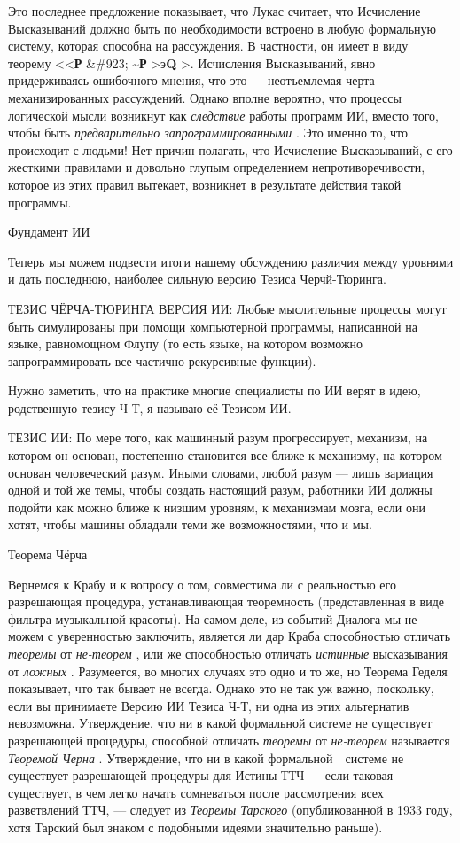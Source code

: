 \documentclass[../main.tex]{subfiles}
\begin{document}
Это последнее предложение показывает, что Лукас считает, что Исчисление Высказываний должно быть по необходимости встроено в любую формальную систему, которая способна на рассуждения. В частности, он имеет в виду теорему \textless\textless{}\textbf{Р} \&\#923; \textbf{\textasciitilde Р} \textgreater э\textbf{Q} \textgreater. Исчисления Высказываний, явно придерживаясь ошибочного мнения, что это --- неотъемлемая черта механизированных рассуждений. Однако вполне вероятно, что процессы логической мысли возникнут как \emph{следствие} работы программ ИИ, вместо того, чтобы быть \emph{предварительно запрограммированными} . Это именно то, что происходит с людьми! Нет причин полагать, что Исчисление Высказываний, с его жесткими правилами и довольно глупым определением непротиворечивости, которое из этих правил вытекает, возникнет в результате действия такой программы.

Фундамент ИИ

Теперь мы можем подвести итоги нашему обсуждению различия между уровнями и дать последнюю, наиболее сильную версию Тезиса Черчй-Тюринга.

ТЕЗИС ЧЁРЧА-ТЮРИНГА ВЕРСИЯ ИИ: Любые мыслительные процессы могут быть симулированы при помощи компьютерной программы, написанной на языке, равномощном Флупу (то есть языке, на котором возможно запрограммировать все частично-рекурсивные функции).

Нужно заметить, что на практике многие специалисты по ИИ верят в идею, родственную тезису Ч-Т, я называю её Тезисом ИИ.

ТЕЗИС ИИ: По мере того, как машинный разум прогрессирует, механизм, на котором он основан, постепенно становится все ближе к механизму, на котором основан человеческий разум. Иными словами, любой разум --- лишь вариация одной и той же темы, чтобы создать настоящий разум, работники ИИ должны подойти как можно ближе к низшим уровням, к механизмам мозга, если они хотят, чтобы машины обладали теми же возможностями, что и мы.

Теорема Чёрча

Вернемся к Крабу и к вопросу о том, совместима ли с реальностью его разрешающая процедура, устанавливающая теоремность (представленная в виде фильтра музыкальной красоты). На самом деле, из событий Диалога мы не можем с уверенностью заключить, является ли дар Краба способностью отличать \emph{теоремы} от \emph{не-теорем} , или же способностью отличать \emph{истинные} высказывания от \emph{ложных} . Разумеется, во многих случаях это одно и то же, но Теорема Геделя показывает, что так бывает не всегда. Однако это не так уж важно, поскольку, если вы принимаете Версию ИИ Тезиса Ч-Т, ни одна из этих альтернатив невозможна. Утверждение, что ни в какой формальной системе не существует разрешающей процедуры, способной отличать \emph{теоремы} от \emph{не-теорем} называется \emph{Теоремой Черна} . Утверждение, что ни в какой формальной~~системе не существует разрешающей процедуры для Истины ТТЧ --- если таковая существует, в чем легко начать сомневаться после рассмотрения всех разветвлений ТТЧ, --- следует из \emph{Теоремы Тарского} (опубликованной в 1933 году, хотя Тарский был знаком с подобными идеями значительно раньше).
\end{document}
